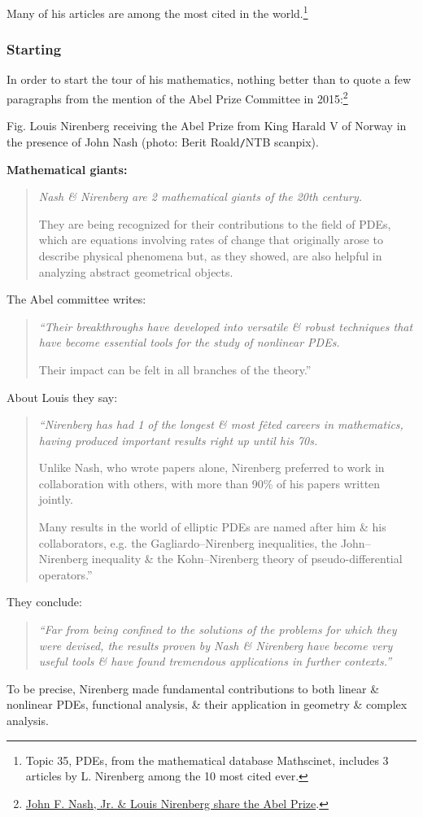 \documentclass{article}
\begin{document}
Many of his articles are among the most cited in the world.\footnote{Topic 35, PDEs, from the mathematical database Mathscinet, includes 3 articles by L. Nirenberg among the 10 most cited ever.}

\subsubsection{Starting}
In order to start the tour of his mathematics, nothing better than to quote a few paragraphs from the mention of the Abel Prize Committee in 2015:\footnote{\href{https://www.abelprize.no/nyheter/vis.html?tid=63589}{John F. Nash, Jr. \& Louis Nirenberg share the Abel Prize}.}

\textsf{Fig. Louis Nirenberg receiving the Abel Prize from King Harald V of Norway in the presence of John Nash (photo: Berit Roald{\tt/}NTB scanpix).}

\textbf{Mathematical giants:}
\begin{quotation}\it
	Nash \& Nirenberg are 2 mathematical giants of the 20th century.
	
	They are being recognized for their contributions to the field of PDEs, which are equations involving rates of change that originally arose to describe physical phenomena but, as they showed, are also helpful in analyzing abstract geometrical objects.
\end{quotation}
The Abel committee writes:
\begin{quotation}\it
	``Their breakthroughs have developed into versatile \& robust techniques that have become essential tools for the study of nonlinear PDEs.
	
	Their impact can be felt in all branches of the theory.''
\end{quotation}
About Louis they say:
\begin{quotation}\it
	``Nirenberg has had 1 of the longest \& most f\^eted careers in mathematics, having produced important results right up until his 70s.
	
	Unlike Nash, who wrote papers alone, Nirenberg preferred to work in collaboration with others, with more than 90\% of his papers written jointly.
	
	Many results in the world of elliptic PDEs are named after him \& his collaborators, e.g. the Gagliardo--Nirenberg inequalities, the John--Nirenberg inequality \& the Kohn--Nirenberg theory of pseudo-differential operators.''
\end{quotation}
They conclude:
\begin{quotation}\it
	``Far from being confined to the solutions of the problems for which they were devised, the results proven by Nash \& Nirenberg have become very useful tools \& have found tremendous applications in further contexts.''
\end{quotation}
To be precise, Nirenberg made fundamental contributions to both linear \& nonlinear PDEs, functional analysis, \& their application in geometry \& complex analysis.
\end{document}
